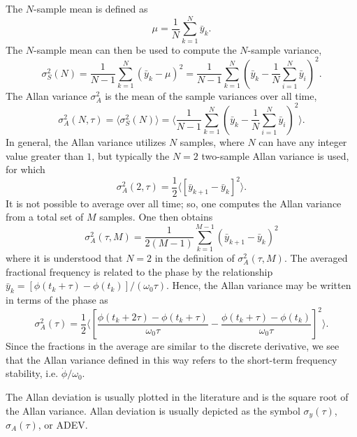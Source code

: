 The $N$-sample mean is defined as
%
\begin{equation}
\mu = \frac{1}{N} \sum_{k=1}^{N} \bar{y}_k.
\end{equation}
%
The $N$-sample mean can then be used to compute the $N$-sample variance,
%
\begin{equation}
\sigma_S^2(N) = \frac{1}{N-1} \sum_{k=1}^{N} \left(\bar{y}_k - \mu\right)^2 = \frac{1}{N-1} \sum_{k=1}^{N} \left(\bar{y}_k - \frac{1}{N} \sum_{i=1}^{N} \bar{y}_i\right)^2.
\end{equation}
%
The Allan variance $\sigma^2_A$ \cite{Allan1974} is the mean of the sample variances over all time,
%
\begin{equation}
\sigma_A^2(N,\tau) = \langle \sigma_S^2(N) \rangle = \bigg\langle \frac{1}{N-1} \sum_{k=1}^{N} \left(\bar{y}_k - \frac{1}{N} \sum_{i=1}^{N} \bar{y}_i\right)^2 \bigg\rangle.
\end{equation}
%
In general, the Allan variance utilizes $N$ samples, where $N$ can have any integer value greater than $1$, but typically the $N=2$ two-sample Allan variance is used, for which
%
\begin{equation} \label{eq:2sallan}
\sigma_A^2(2, \tau) = \frac{1}{2}\langle [\bar{y}_{k+1} - \bar{y}_{k}]^2 \rangle.
\end{equation}
%
It is not possible to average over all time; so, one computes the Allan variance from a total set of $M$ samples. One then obtains
%
\begin{equation}
\sigma_A^2(\tau,M) = \frac{1}{2(M-1)}\sum_{k=1}^{M-1} \left(\bar{y}_{k+1} - \bar{y}_{k}\right)^2
\end{equation}
%
where it is understood that $N=2$ in the definition of $\sigma_A^2(\tau,M)$.
The averaged fractional frequency is related to the phase by the relationship $\bar{y}_k = [\phi(t_k+\tau) - \phi(t_k)]/(\omega_0\tau)$. Hence, the Allan variance may be written in terms of the phase as
% 
\begin{equation} \label{eq:phiallan}
\sigma_A^2(\tau) = \frac{1}{2}\bigg\langle \left[\frac{\phi(t_k+2\tau) - \phi(t_k+\tau)}{\omega_0\tau} - \frac{\phi(t_k+\tau) - \phi(t_k)}{\omega_0\tau}\right]^2 \bigg\rangle.
\end{equation}
Since the fractions in the average are similar to the discrete derivative, we see that the Allan variance defined in this way refers to the short-term frequency stability, i.e. $\dot{\phi}/\omega_0$.

The Allan deviation is usually plotted in the literature and is the square root of the Allan variance. Allan deviation is usually depicted as the symbol $\sigma_y(\tau)$, $\sigma_A(\tau)$, or ADEV.

